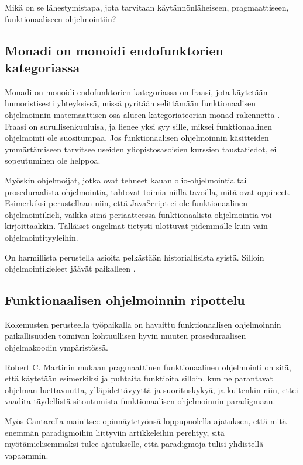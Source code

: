 Mikä on se lähestymistapa, jota tarvitaan käytännönläheiseen, pragmaattiseen, funktionaaliseen ohjelmointiin?

\subsection{Monadi on monoidi endofunktorien kategoriassa}

Monadi on monoidi endofunktorien kategoriassa on fraasi, jota käytetään humoristisesti yhteyksissä, missä pyritään selittämään funktionaalisen ohjelmoinnin matemaattisen osa-alueen kategoriateorian \gls{monad}-rakennetta \cite{bartosz_category_for_progamers_10}. Fraasi on surullisenkuuluisa, ja lienee yksi syy sille, miksei funktionaalinen ohjelmointi ole suositumpaa. Jos funktionaalisen ohjelmoinnin käsitteiden ymmärtämiseen tarvitsee useiden yliopistosasoisien kurssien taustatiedot, ei sopeutuminen ole helppoa.

Myöskin ohjelmoijat, jotka ovat tehneet kauan olio-ohjelmointia tai proseduraalista ohjelmointia, tahtovat toimia niillä tavoilla, mitä ovat oppineet. Esimerkiksi perustellaan niin, että JavaScript ei ole funktionaalinen ohjelmointikieli, vaikka siinä periaatteessa funktionaalista ohjelmointia voi kirjoittaakkin. Tälläiset ongelmat tietysti ulottuvat pidemmälle kuin vain ohjelmointityyleihin. \citep{is_reduce_bad}

On harmillista perustella asioita pelkästään historiallisista syistä. Silloin ohjelmointikieleet jäävät paikalleen \cite{promises-spec-94}.

\subsection{Funktionaalisen ohjelmoinnin ripottelu}

Kokemusten perusteella työpaikalla on havaittu funktionaalisen ohjelmoinnin paikallisuuden toimivan kohtuullisen hyvin muuten proseduraalisen ohjelmakoodin ympäristössä.

Robert C. Martinin mukaan pragmaattinen funktionaalinen ohjelmointi on sitä, että käytetään esimerkiksi  ja puhtaita funktioita silloin, kun ne parantavat ohjelman luettavuutta, ylläpidettävyyttä ja suorituskykyä, ja kuitenkin niin, ettei vaadita täydellistä sitoutumista funktionaalisen ohjelmoinnin paradigmaan. \citep{martin2017pragmaticfp}

Myös Cantarella mainitsee opinnäytetyönsä loppupuolella ajatuksen, että mitä enemmän paradigmoihin liittyviin artikkeleihin perehtyy, sitä myötämielisemmäksi tulee ajatukselle, että paradigmoja tulisi yhdistellä vapaammin. \citep[45]{cantarella_fp_haitat}

